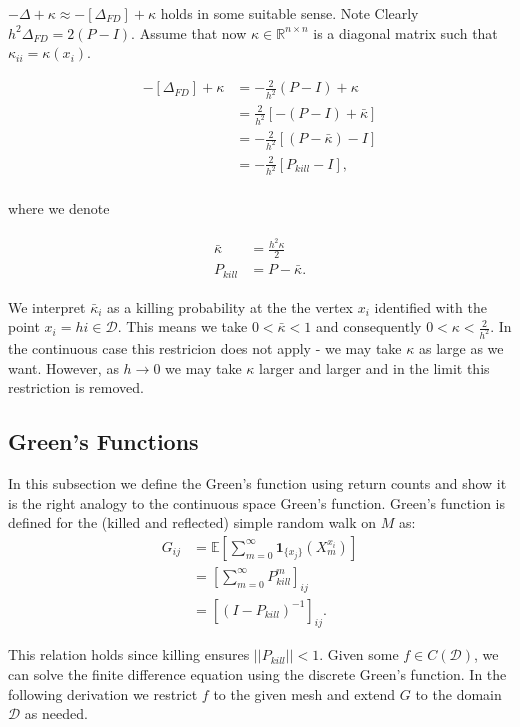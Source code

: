 \documentclass[paper=a4, fontsize=11pt]{scrartcl} %
\numberwithin{equation}{section} %
\numberwithin{figure}{section} %
\numberwithin{table}{section} %
\newcommand{\dom}{\mathcal{D}}
\begin{document}
$-\Delta + \kappa \approx -[\Delta_{FD}] + \kappa$ holds in some suitable sense. Note
Clearly $h^2\Delta_{FD} = 2(P-I)$. Assume 
that now $\kappa \in \mathbb{R}^{n \times n}$ is a diagonal matrix such that 
$\kappa_{ii} =  \kappa(x_i)$.

\begin{align*}
  -[\Delta_{FD}] + \kappa  &= -\frac{2}{h^2}(P-I) + \kappa \\
  &= \frac{2}{h^2}[-(P-I) + \bar{\kappa}] \\
  &=-\frac{2}{h^2}[(P- \bar{\kappa}) -I] \\
  &=-\frac{2}{h^2}[P_{kill} -I], \\
\end{align*}


where we denote

\begin{align}\label{kappas}
  \begin{split}
    \bar{\kappa} &= \frac{h^2\kappa}{2} \\
    P_{kill} &= P - \bar{\kappa}.
  \end{split}
\end{align}

We interpret $\bar{\kappa}_i$ as a killing probability at the the vertex $x_i$ identified
with the point $x_i = hi \in \dom$. This means we take $0 < \bar{\kappa} < 1$ and
consequently $ 0 < \kappa < \frac{2}{h^2}$. In the continuous case this restricion
does not apply - we may
take $\kappa$ as large as we want. However,
as $h \to 0$ we may take $\kappa$ larger and larger and in the limit this
restriction is removed. 

\subsection{Green's Functions}
In this subsection we define the Green's function using return counts and show
it is the right analogy to the continuous space Green's function.
Green's function is defined for the (killed and reflected) simple random walk on $M$ as:
\begin{align*}
  G_{ij}  &= \mathbb{E} [ \sum_{m=0}^{\infty} \mathbf{1}_{ \{x_j\} }( X^{x_i}_m)] \\
  &= [\sum_{m=0}^{\infty} P_{kill}^m ]_{ij} \\
  &= [(I - P_{kill})^{-1}]_{ij}.
\end{align*}

This relation holds since killing ensures $||P_{kill}|| < 1$. Given some $f \in C(\dom)$, we can 
solve the finite difference equation using the discrete Green's function. In the following derivation 
we restrict $f$ to the given mesh and extend $G$ to the domain $\dom$ as needed.
\end{document}
